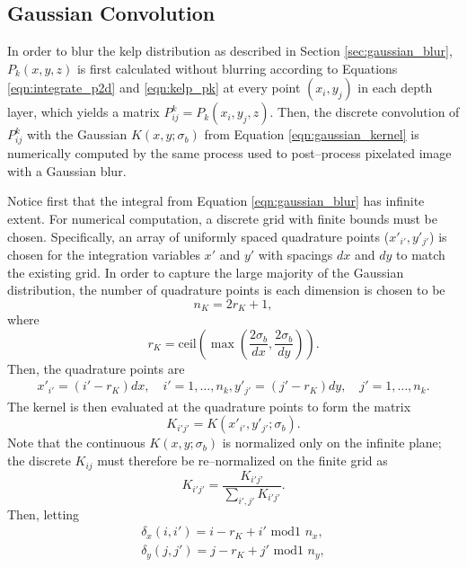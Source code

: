 \documentclass[ms,cpyr,lof,lot]{uathesis}
\newcommand{\ceil}{\mbox{ceil}}
\begin{document}
\subsection{Gaussian Convolution}
In order to blur the kelp distribution as described in Section \ref{sec:gaussian_blur}, $P_k(x, y, z)$ is first calculated without blurring according to Equations \eqref{eqn:integrate_p2d} and \eqref{eqn:kelp_pk} at every point $(x_i, y_j)$ in each depth layer, which yields a matrix $P_{ij}^k = P_k(x_i, y_j, z)$.
Then, the discrete convolution of $P_{ij}^k$ with the Gaussian $K(x, y; \sigma_b)$ from Equation \eqref{eqn:gaussian_kernel} is numerically computed by the same process used to post--process pixelated image with a Gaussian blur.

Notice first that the integral from Equation \eqref{eqn:gaussian_blur} has infinite extent.
For numerical computation, a discrete grid with finite bounds must be chosen.
Specifically, an array of uniformly spaced quadrature points ($x'_{i'}, y'_{j'}$) is chosen for the integration variables $x'$ and $y'$ with spacings $dx$ and $dy$ to match the existing grid.
In order to capture the large majority of the Gaussian distribution, the number of quadrature points is each dimension is chosen to be
\begin{equation}
  n_K = 2r_K+1,
\end{equation}
where
\begin{equation}
  r_K = \ceil\left(\max\left(\frac{2\sigma_b}{dx}, \frac{2\sigma_b}{dy}\right)\right).
\end{equation}
Then, the quadrature points are
\begin{align*}
  x'_{i'} = (i'-r_K)dx, \quad i'=1,\ldots,n_k,
  y'_{j'} = (j'-r_K)dy, \quad j'=1,\ldots,n_k.
\end{align*}
The kernel is then evaluated at the quadrature points to form the matrix
\begin{equation*}
  K_{i'j'} = K\left(x'_{i'}, y'_{j'}; \sigma_b\right).
\end{equation*}
Note that the continuous $K(x, y; \sigma_b)$ is normalized only on the infinite plane;
the discrete $K_{ij}$ must therefore be re--normalized on the finite grid as
\begin{equation*}
  K_{i'j'} = \frac{K_{i'j'}}{\sum_{i',j'} K_{i'j'}}.
\end{equation*}
Then, letting
\begin{align*}
  \delta_x(i, i') = i - r_K + i'\mbox{ mod1 }n_x, \\
  \delta_y(j, j') = j - r_K + j'\mbox{ mod1 }n_y,
\end{align*}
\end{document}
